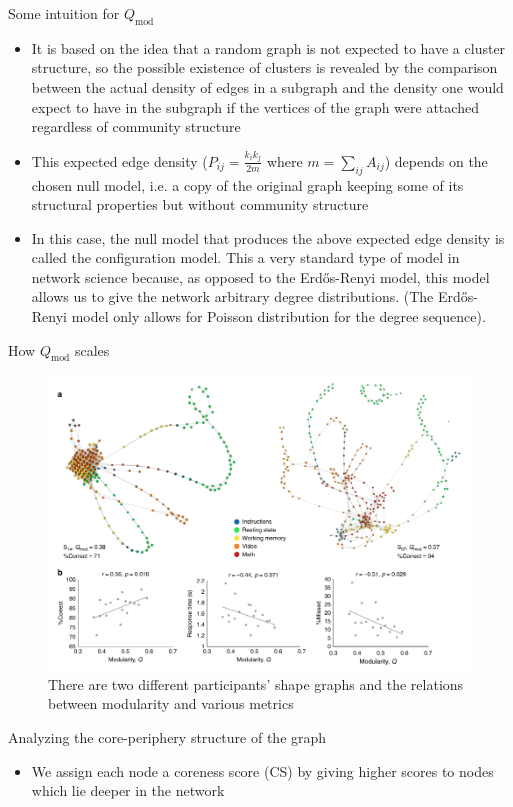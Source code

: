 \documentclass{beamer}
\begin{document}
\begin{frame}{Some intuition for $Q_{\mathrm{mod}}$}
    \begin{itemize}
        \item It is based on the idea that a random graph is not expected to have a cluster structure, so the possible existence of clusters is revealed by the comparison between the actual density of edges in a subgraph and the density one would expect to have in the subgraph if the vertices of the graph
        were attached regardless of community structure
        \item This expected edge density ($P_{ij} = \frac{k_ik_j}{2m}$ where $m = \sum_{ij}A_{ij}$) depends on the chosen null model, i.e. a copy of the original graph keeping some of its structural properties but without community structure\cite{community}\pause
        \item In this case, the null model that produces the above expected edge density is called the configuration model. This a very standard type of model in network science because, as opposed to the Erd\H{o}s-Renyi model, this model allows us to give the network arbitrary degree distributions. (The Erd\H{o}s-Renyi model only allows for Poisson distribution for the degree sequence).
    \end{itemize}
\end{frame}

\begin{frame}{How $Q_{\mathrm{mod}}$ scales}
    \begin{figure}
        \includegraphics[width = 0.75\linewidth]{fig3.png}
        \caption{There are two different participants' shape graphs and the relations between modularity and various metrics}
    \end{figure}
\end{frame}

\begin{frame}{Analyzing the core-periphery structure of the graph}
    \begin{itemize}
        \item We assign each node a coreness score (CS) by giving higher scores to nodes which lie deeper in the network
    \end{itemize}
\end{frame}
\end{document}
